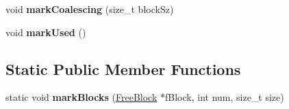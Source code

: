 \begin{DoxyCompactItemize}
\item 
\hypertarget{classrml_1_1internal_1_1FreeBlock_a3ce0e6bfe3611b907f50f4a37b6baa39}{}void {\bfseries mark\+Coalescing} (size\+\_\+t block\+Sz)\label{classrml_1_1internal_1_1FreeBlock_a3ce0e6bfe3611b907f50f4a37b6baa39}

\item 
\hypertarget{classrml_1_1internal_1_1FreeBlock_a551ebe51b611de44a1ae83546c084321}{}void {\bfseries mark\+Used} ()\label{classrml_1_1internal_1_1FreeBlock_a551ebe51b611de44a1ae83546c084321}

\end{DoxyCompactItemize}
\subsection*{Static Public Member Functions}
\begin{DoxyCompactItemize}
\item 
\hypertarget{classrml_1_1internal_1_1FreeBlock_aa5bf7b2524e73ac7930fe322b4a5dc95}{}static void {\bfseries mark\+Blocks} (\hyperlink{classrml_1_1internal_1_1FreeBlock}{Free\+Block} $\ast$f\+Block, int num, size\+\_\+t size)\label{classrml_1_1internal_1_1FreeBlock_aa5bf7b2524e73ac7930fe322b4a5dc95}

\end{DoxyCompactItemize}
